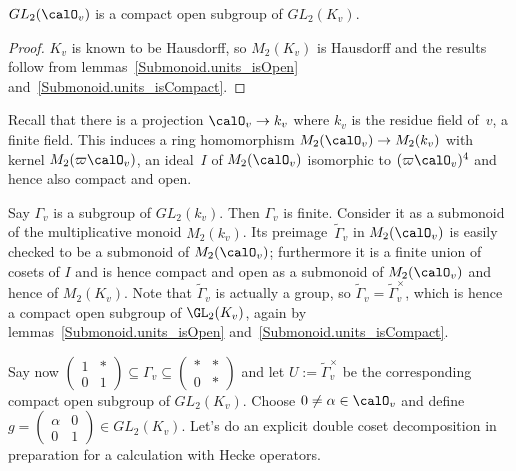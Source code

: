 \begin{lemma} $GL_2(\calO_v)$ is a compact open subgroup of $GL_2(K_v)$.
\end{lemma}
\begin{proof} $K_v$ is known to be Hausdorff, so $M_2(K_v)$ is Hausdorff and the
  results follow from lemmas~\ref{Submonoid.units_isOpen} and~\ref{Submonoid.units_isCompact}.
\end{proof}

Recall that there is a projection $\calO_v\to k_v$ where $k_v$ is the residue
field of~$v$, a finite field. This induces a ring homomorphism $M_2(\calO_v)\to M_2(k_v)$
with kernel $M_2(\varpi\calO_v)$, an ideal~$I$ of $M_2(\calO_v)$ isomorphic to $(\varpi\calO_v)^4$
and hence also compact and open.

Say $\Gamma_v$ is a subgroup of $GL_2(k_v)$. Then $\Gamma_v$ is finite. Consider it as a submonoid of
the multiplicative monoid $M_2(k_v)$. Its preimage~$\tilde{\Gamma}_v$ in $M_2(\calO_v)$
is easily checked to be a submonoid of $M_2(\calO_v)$; furthermore it is a finite union of
cosets of $I$ and is hence compact and open as a submonoid of $M_2(\calO_v)$ and hence of $M_2(K_v)$.
Note that $\tilde\Gamma_v$ is actually a group, so $\tilde\Gamma_v=\tilde\Gamma_v^\times$, which is
hence a compact open subgroup of $\GL_2(K_v)$, again by lemmas~\ref{Submonoid.units_isOpen}
and~\ref{Submonoid.units_isCompact}.

Say now $\begin{pmatrix}1&*\\0&1\end{pmatrix}\subseteq\Gamma_v\subseteq\begin{pmatrix}*&*\\0&*\end{pmatrix}$
and let $U:=\tilde\Gamma_v^\times$ be the corresponding compact open subgroup of $GL_2(K_v)$.
Choose $0\not=\alpha\in\calO_v$ and define $g=\begin{pmatrix}\alpha&0\\0&1\end{pmatrix}\in GL_2(K_v)$.
Let's do an explicit double coset decomposition in preparation for a calculation with Hecke operators.

